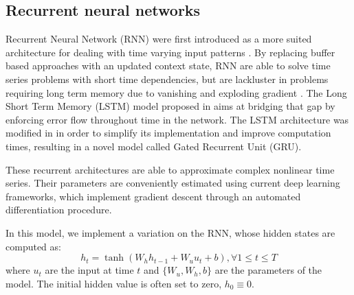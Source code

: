 \documentclass{article}
\begin{document}
\subsection{Recurrent neural networks}
\label{sec:background:rnn}
Recurrent Neural Network (RNN) were first introduced as a more suited architecture for dealing with time varying input patterns \cite{Mozer1989AFB}.
By replacing buffer based approaches with an updated context state, RNN are able to solve time series problems with short time dependencies, but are lackluster in problems requiring long term memory due to vanishing and exploding gradient \cite{Bengio1994LearningLD}.
The Long Short Term Memory (LSTM) model proposed in \cite{Hochreiter1997LongSM} aims at bridging that gap by enforcing error flow throughout time in the network.
The LSTM architecture was modified in \cite{Cho2014LearningPR} in order to simplify its implementation and improve computation times, resulting in a novel model called Gated Recurrent Unit (GRU).

These recurrent architectures are able to approximate complex nonlinear time series.
Their parameters are conveniently estimated using current deep learning frameworks, which implement gradient descent through an automated differentiation procedure.

In this model, we implement a variation on the RNN, whose hidden states are computed as:
$$
	h_t = \tanh(W_h h_{t-1} + W_u u_t + b), \forall 1 \leq t \leq T
$$
where $u_t$ are the input at time $t$ and $\{W_u, W_h, b\}$ are the parameters of the model. The initial hidden value is often set to zero, $h_0 \equiv 0$.


\end{document}
